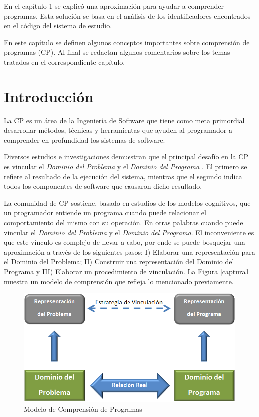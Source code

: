 

En el capítulo 1 se explicó una aproximación para ayudar a comprender programas. Esta solución se basa en el análisis de los identificadores encontrados en el código del sistema de estudio.

En este capítulo se definen algunos conceptos importantes sobre comprensión de programas (CP). Al final se redactan algunos comentarios sobre los temas tratados en el correspondiente capítulo.

\section{Introducción}

La CP es un área de la Ingeniería de Software que tiene como meta primordial desarrollar métodos, técnicas y herramientas que ayuden al programador a comprender en profundidad los sistemas de software. 

Diversos estudios e investigaciones demuestran que el principal desafío en la CP es vincular el \textit{Dominio del Problema} y el \textit{Dominio del Programa} \cite{BRM10,MPMR07,MBPHRU10,DWE04}. El primero se refiere al resultado de la ejecución del sistema, mientras que el segundo indica todos los componentes de software que causaron dicho resultado. 

La comunidad de CP sostiene, basado en estudios de los modelos cognitivos, que un programador entiende un programa cuando puede relacionar el comportamiento del mismo con su operación. En otras palabras cuando puede vincular el \textit{Dominio del Problema} y el \textit{Dominio del Programa}. El inconveniente es que este vínculo es complejo de llevar a cabo, por ende se puede bosquejar una aproximación a través de los siguientes pasos: I) Elaborar una representación para el Dominio del Problema; II) Construir una representación del Dominio del Programa y III) Elaborar un procedimiento de vinculación. La Figura \ref{captura1} muestra un modelo de comprensión que refleja lo mencionado previamente.

\begin{figure}[t] %
\centerline{%
\includegraphics[scale= 0.7]{./cap2/dom.png}
}
\caption{Modelo de Comprensión de Programas}
\end{figure} \label{captura1}
 
